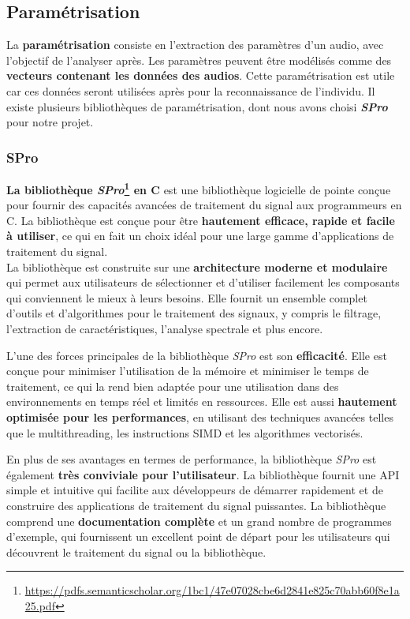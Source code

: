 \subsection{Paramétrisation}
\label{subsec:Parametrisation}

La \textbf{paramétrisation} consiste en l'extraction des paramètres d'un audio, avec l'objectif de l'analyser après. Les paramètres peuvent être modélisés comme
des \textbf{vecteurs contenant les données des audios}. Cette paramétrisation est utile car ces données seront utilisées après pour la reconnaissance de
l'individu. Il existe plusieurs bibliothèques de paramétrisation, dont nous avons choisi \textbf{\textit{SPro}} pour notre projet.\\


\subsubsection{SPro}
\textbf{La bibliothèque \textit{SPro}\footnote{\url{https://pdfs.semanticscholar.org/1bc1/47e07028cbe6d2841e825c70abb60f8e1a25.pdf}} en C} est une bibliothèque logicielle de pointe conçue pour fournir des capacités avancées de traitement du signal
aux programmeurs en C. La bibliothèque est conçue pour être\textbf{ hautement efficace, rapide et facile à utiliser}, ce qui en fait un choix idéal
pour une large gamme d'applications de traitement du signal.\\

La bibliothèque est construite sur une \textbf{architecture moderne et modulaire} qui permet aux utilisateurs de sélectionner et d'utiliser facilement
les composants qui conviennent le mieux à leurs besoins. Elle fournit un ensemble complet d'outils et d'algorithmes pour le traitement des signaux,
y compris le filtrage, l'extraction de caractéristiques, l'analyse spectrale et plus encore.

L'une des forces principales de la bibliothèque \textit{SPro} est son \textbf{efficacité}. Elle est conçue pour minimiser l'utilisation de la
mémoire et minimiser le temps de traitement, ce qui la rend bien adaptée pour une utilisation dans des environnements en temps réel et limités en ressources.
Elle est aussi \textbf{ hautement optimisée pour les performances}, en utilisant des techniques avancées telles que le multithreading, les instructions SIMD
et les algorithmes vectorisés.

En plus de ses avantages en termes de performance, la bibliothèque \textit{SPro} est également \textbf{très conviviale pour l'utilisateur}. La bibliothèque
fournit une API simple et intuitive qui facilite aux développeurs de démarrer rapidement et de construire des applications de traitement du signal puissantes.
La bibliothèque comprend une \textbf{documentation complète} et un grand nombre de programmes d'exemple, qui fournissent un excellent point de départ pour les
utilisateurs qui découvrent le traitement du signal ou la bibliothèque.\\


